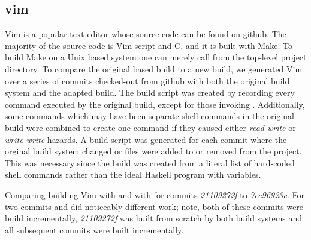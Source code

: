 \subsection{vim}
\label{sec:eval:vim}



Vim is a popular text editor whose source code can be found on \href{https://github.com/vim/vim}{github}.  The majority of the source code is Vim script and C, and it is built with Make.  To build Make on a Unix based system one can merely call \Make from the top-level project directory.  To compare the original \Make based build to a new \Rattle build, we generated Vim over a series of commits checked-out from github with both the original build system and the adapted \Rattle build.  The \Rattle build script was created by recording every command executed by the original build, except for those invoking \Make.  Additionally, some commands which may have been separate shell commands in the original build were combined to create one command if they caused either \emph{read-write} or \emph{write-write} hazards.  A \Rattle build script was generated for each commit where the orginal build system changed or files were added to or removed from the project.  This was necessary since the \Rattle build was created from a literal list of hard-coded shell commands rather than the ideal Haskell program with variables.


Comparing building Vim \cite{} with \Make and with \Rattle for commits \emph{21109272f} to \emph{7cc96923c}.  For two commits \Make and \Rattle did noticeably different work; note, both of these commits were build incrementally, \emph{21109272f} was built from scratch by both build systems and all subsequent commits were built incrementally.

